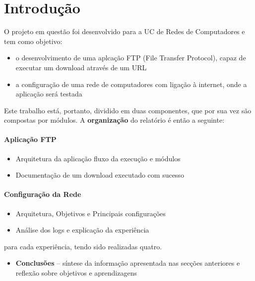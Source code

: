 

\section{Introdução}

O projeto em questão foi desenvolvido para a UC de Redes de Computadores e tem como objetivo:

\begin{itemize}
    \item o desenvolvimento de uma aplcação FTP (File Transfer Protocol), capaz de executar um download através de um URL
    \item a configuração de uma rede de computadores com ligação à internet, onde a aplicação será testada
\end{itemize}

Este trabalho está, portanto, dividido em duas componentes, que por sua vez são compostas por módulos. A \textbf{organização} do relatório é então a seguinte:

\paragraph{Aplicação FTP}
\begin{itemize}
    \item Arquitetura da aplicação fluxo da execução e módulos
    \item Documentação de um download executado com sucesso
\end{itemize}



\paragraph{Configuração da Rede} 

\begin{itemize}
    \item Arquitetura, Objetivos e Principais configurações
    \item Análise dos logs e explicação da experiência
\end{itemize}
para cada experiência, tendo sido realizadas quatro.

\begin{itemize}
    \item \textbf{Conclusões} – síntese da informação apresentada nas secções anteriores e reflexão sobre objetivos e aprendizagens
\end{itemize}